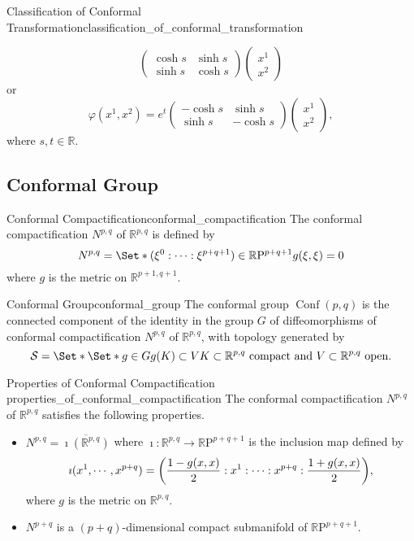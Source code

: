 \documentclass{article}
\begin{document}
\begin{theorem}{Classification of Conformal Transformation}{classification_of_conformal_transformation}
\begin{itemize}
\[\begin{pmatrix}
            \cosh s & \sinh s \\ \sinh s & \cosh s
        \end{pmatrix} \begin{pmatrix}
            x^1 \\ x^2
        \end{pmatrix} \]
        or
        \[ \varphi(x^1,x^2) = e^t \begin{pmatrix}
            -\cosh s & \sinh s \\ \sinh s & -\cosh s
        \end{pmatrix} \begin{pmatrix}
            x^1 \\ x^2
        \end{pmatrix}, \]
        where $s,t\in\mathbb{R}$.
    \end{itemize}
\end{theorem}

\subsection{Conformal Group}

\begin{definition}{Conformal Compactification}{conformal_compactification}
    The conformal compactification $N^{p,q}$ of $\mathbb{R}^{p,q}$ is defined by
    \[ N^{p,q} = \Set*{(\xi^0 : \cdots : \xi^{p+q+1})\in \mathbb{R}\mathrm{P}^{p+q+1}}{g(\xi,\xi) = 0} \]
    where $g$ is the metric on $\mathbb{R}^{p+1,q+1}$.
\end{definition}

\begin{definition}{Conformal Group}{conformal_group}
    The conformal group $\operatorname{Conf}(p,q)$ is the connected component of the identity in the group $G$ of diffeomorphisms of conformal compactification $N^{p,q}$ of $\mathbb{R}^{p,q}$, with topology generated by
    \[ \mathcal{S} = \Set*{\Set*{g\in G}{g(K)\subset V}}{K\subset \mathbb{R}^{p,q} \text{ compact and } V\subset \mathbb{R}^{p,q} \text{ open}}. \]
\end{definition}

\begin{proposition}{Properties of Conformal Compactification }{properties_of_conformal_compactification}
    The conformal compactification $N^{p,q}$ of $\mathbb{R}^{p,q}$ satisfies the following properties.
    \begin{itemize}
        \item $N^{p,q} = \overline{\imath(\mathbb{R}^{p,q})}$ where $\imath:\mathbb{R}^{p,q} \rightarrow \mathbb{R}\mathrm{P}^{p+q+1}$ is the inclusion map defined by
        \[ \imath(x^1,\cdots,x^{p+q}) = \qty(\frac{1-g(x,x)}{2}: x^1 : \cdots : x^{p+q} : \frac{1+g(x,x)}{2}), \]
        where $g$ is the metric on $\mathbb{R}^{p,q}$.
        \item $N^{p+q}$ is a $(p+q)$-dimensional compact submanifold of $\mathbb{R}\mathrm{P}^{p+q+1}$.
    \end{itemize}
\end{proposition}
\end{document}
